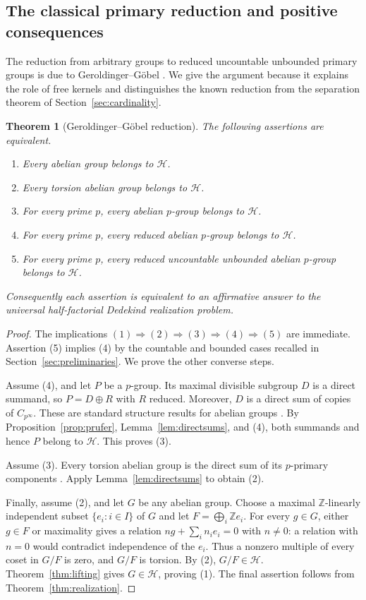 \documentclass[11pt,reqno]{amsart}
\numberwithin{equation}{section}
\newtheorem{theorem}{Theorem}[section]
\theoremstyle{definition}
\theoremstyle{remark}
\newcommand{\Z}{\mathbb Z}
\newcommand{\HF}{\mathcal H}
\begin{document}
\subsection{The classical primary reduction and positive consequences}

The reduction from arbitrary groups to reduced uncountable unbounded
primary groups is due to Geroldinger--G\"obel
\cite[pp.~855--856]{GeroldingerGoebel}. We give the argument because
it explains the role of free kernels and distinguishes the known
reduction from the separation theorem of Section~\ref{sec:cardinality}.

\begin{theorem}[Geroldinger--G\"obel reduction]\label{thm:reduction}
The following assertions are equivalent.
\begin{enumerate}[label=\textup{(\arabic*)},leftmargin=2.2em]
\item Every abelian group belongs to $\HF$.
\item Every torsion abelian group belongs to $\HF$.
\item For every prime $p$, every abelian $p$-group belongs to $\HF$.
\item For every prime $p$, every reduced abelian $p$-group belongs
      to $\HF$.
\item For every prime $p$, every reduced uncountable unbounded
      abelian $p$-group belongs to $\HF$.
\end{enumerate}
Consequently each assertion is equivalent to an affirmative answer
to the universal half-factorial Dedekind realization problem.
\end{theorem}

\begin{proof}
The implications
$(1)\Rightarrow(2)\Rightarrow(3)\Rightarrow(4)\Rightarrow(5)$
are immediate. Assertion (5) implies (4) by the countable and bounded cases recalled in
Section~\ref{sec:preliminaries}. We prove the other converse steps.

Assume (4), and let $P$ be a $p$-group. Its maximal divisible
subgroup $D$ is a direct summand, so $P=D\oplus R$ with $R$
reduced. Moreover, $D$ is a direct sum of copies of
$C_{p^\infty}$. These are standard structure results for abelian
groups \cite{Fuchs}. By Proposition~\ref{prop:prufer},
Lemma~\ref{lem:directsums}, and (4), both summands and hence $P$
belong to $\HF$. This proves (3).

Assume (3). Every torsion abelian group is the direct sum of its
$p$-primary components \cite{Fuchs}. Apply
Lemma~\ref{lem:directsums} to obtain (2).

Finally, assume (2), and let $G$ be any abelian group. Choose a
maximal $\Z$-linearly independent subset $\{e_i:i\in I\}$ of
$G$ and let $F=\bigoplus_i\Z e_i$. For every $g\in G$, either
$g\in F$ or maximality gives a relation
$ng+\sum_i n_i e_i=0$ with $n\ne0$: a relation with $n=0$
would contradict independence of the $e_i$. Thus a nonzero
multiple of every coset in $G/F$ is zero, and $G/F$ is torsion.
By (2), $G/F\in\HF$. Theorem~\ref{thm:lifting} gives $G\in\HF$,
proving (1). The final assertion follows from
Theorem~\ref{thm:realization}.
\end{proof}
\end{document}
